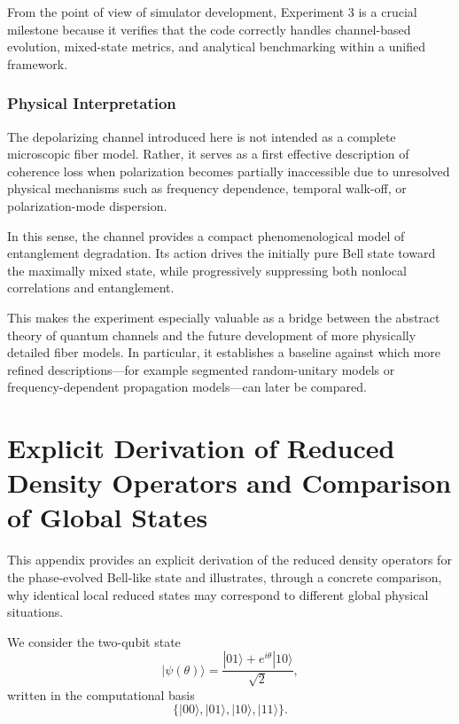 \documentclass[a4paper]{article}
\begin{document}
From the point of view of simulator development, Experiment 3 is a crucial milestone because it verifies that the code correctly handles channel-based evolution, mixed-state metrics, and analytical benchmarking within a unified framework.

\subsubsection{Physical Interpretation}

The depolarizing channel introduced here is not intended as a complete microscopic fiber model. Rather, it serves as a first effective description of coherence loss when polarization becomes partially inaccessible due to unresolved physical mechanisms such as frequency dependence, temporal walk-off, or polarization-mode dispersion.

In this sense, the channel provides a compact phenomenological model of entanglement degradation. Its action drives the initially pure Bell state toward the maximally mixed state, while progressively suppressing both nonlocal correlations and entanglement.

This makes the experiment especially valuable as a bridge between the abstract theory of quantum channels and the future development of more physically detailed fiber models. In particular, it establishes a baseline against which more refined descriptions---for example segmented random-unitary models or frequency-dependent propagation models---can later be compared.

\appendix
\section{Explicit Derivation of Reduced Density Operators and Comparison of Global States}

This appendix provides an explicit derivation of the reduced density operators for the phase-evolved Bell-like state and illustrates, through a concrete comparison, why identical local reduced states may correspond to different global physical situations.

We consider the two-qubit state
\[
|\psi(\theta)\rangle = \frac{|01\rangle + e^{i\theta}|10\rangle}{\sqrt{2}},
\]
written in the computational basis
\[
\{|00\rangle, |01\rangle, |10\rangle, |11\rangle\}.
\]
\end{document}
